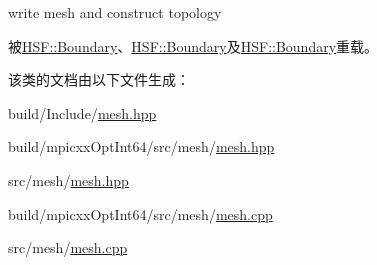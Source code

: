 write mesh and construct topology 

被\hyperlink{classHSF_1_1Boundary_aa9891dd719196ca7307e0327d1eaf39f}{HSF::Boundary}、\hyperlink{classHSF_1_1Boundary_aa9891dd719196ca7307e0327d1eaf39f}{HSF::Boundary}及\hyperlink{classHSF_1_1Boundary_aa9891dd719196ca7307e0327d1eaf39f}{HSF::Boundary}重载。

该类的文档由以下文件生成：\begin{DoxyCompactItemize}
\item 
build/Include/\hyperlink{build_2Include_2mesh_8hpp}{mesh.hpp}\item 
build/mpicxxOptInt64/src/mesh/\hyperlink{build_2mpicxxOptInt64_2src_2mesh_2mesh_8hpp}{mesh.hpp}\item 
src/mesh/\hyperlink{src_2mesh_2mesh_8hpp}{mesh.hpp}\item 
build/mpicxxOptInt64/src/mesh/\hyperlink{build_2mpicxxOptInt64_2src_2mesh_2mesh_8cpp}{mesh.cpp}\item 
src/mesh/\hyperlink{src_2mesh_2mesh_8cpp}{mesh.cpp}\end{DoxyCompactItemize}
